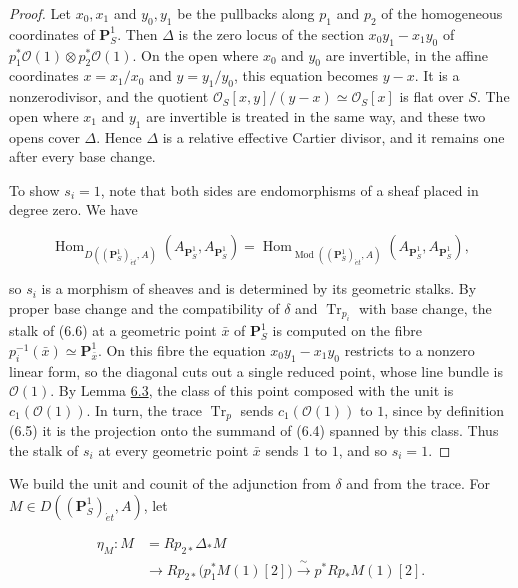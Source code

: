 \documentclass[11pt]{article}
\providecommand{\Hom}{}\renewcommand{\Hom}{\operatorname{Hom}}
\begin{document}
\begin{proof}[{Proof}]\label{bp20}%
Let \(x_0,x_1\) and \(y_0,y_1\) be the pullbacks along \(p_1\) and \(p_2\) of the homogeneous coordinates of \(\mathbf P^1_S\). Then \(\Delta\) is the zero locus of the section \(x_0y_1-x_1y_0\) of \(p_1^*\mathcal O(1)\otimes p_2^*\mathcal O(1)\). On the open where \(x_0\) and \(y_0\) are invertible, in the affine coordinates \(x=x_1/x_0\) and \(y=y_1/y_0\), this equation becomes \(y-x\). It is a nonzerodivisor, and the quotient \(\mathcal O_S[x,y]/(y-x)\simeq\mathcal O_S[x]\) is flat over \(S\). The open where \(x_1\) and \(y_1\) are invertible is treated in the same way, and these two opens cover \(\Delta\). Hence \(\Delta\) is a relative effective Cartier divisor, and it remains one after every base change.

To show \(s_i=1\), note that both sides are endomorphisms of a sheaf placed in degree zero. We have

\[
\Hom_{D((\mathbf P^1_S)_{\acute{e}t},A)}
(A_{\mathbf P^1_S},A_{\mathbf P^1_S})
=\Hom_{\operatorname{Mod}((\mathbf P^1_S)_{\acute{e}t},A)}
(A_{\mathbf P^1_S},A_{\mathbf P^1_S}),
\]

so \(s_i\) is a morphism of sheaves and is determined by its geometric stalks. By proper base change and the compatibility of \(\delta\) and \(\operatorname{Tr}_{p_i}\) with base change, the stalk of (6.6) at a geometric point \(\bar x\) of \(\mathbf P^1_S\) is computed on the fibre \(p_i^{-1}(\bar x)\simeq\mathbf P^1_{\bar x}\). On this fibre the equation \(x_0y_1-x_1y_0\) restricts to a nonzero linear form, so the diagonal cuts out a single reduced point, whose line bundle is \(\mathcal O(1)\). By Lemma \hyperref[bp11]{6.3}, the class of this point composed with the unit is \(c_1(\mathcal O(1))\). In turn, the trace \(\operatorname{Tr}_p\) sends \(c_1(\mathcal O(1))\) to \(1\), since by definition (6.5) it is the projection onto the summand of (6.4) spanned by this class. Thus the stalk of \(s_i\) at every geometric point \(\bar x\) sends \(1\) to \(1\), and so \(s_i=1\).
\end{proof}

\label{bp21}%
We build the unit and counit of the adjunction from \(\delta\) and from the trace. For \(M\in D((\mathbf P^1_S)_{\acute{e}t},A)\), let

\[
\begin{split}
\eta_M:M
&=Rp_{2*}\Delta_*M\\
&\longrightarrow Rp_{2*}\bigl(p_1^*M(1)[2]\bigr)
\xrightarrow{\ \sim\ }p^*Rp_*M(1)[2] .
\end{split}
\tag{6.7}
\]
\end{document}
